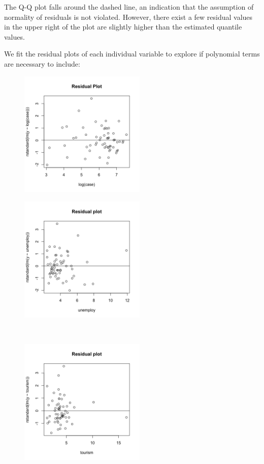 \documentclass{article}
\begin{document}
The Q-Q plot falls around the dashed line, an indication that the assumption of normality of residuals is not violated. However, there exist a few residual values in the upper right of the plot are slightly higher than the estimated quantile values. 
 
We fit the residual plots of each individual variable to explore if polynomial terms are necessary to include:

\begin{figure}[H]
\centering
\begin{minipage}{.5\textwidth}
  \centering
  \includegraphics[width= 6cm]{logcase-res.png}
  \label{fig:resid-urban}
\end{minipage}%
\begin{minipage}{.5\textwidth}
  \centering
  \includegraphics[width= 6cm]{unem-res.png}
  \label{fig:resid-tour}
\end{minipage}
\end{figure}\\
\begin{figure}[H]
  \centering
  \includegraphics[width= 6cm]{tourism-res.png}
  \label{fig:resid-tour}
\end{figure}
\end{document}
